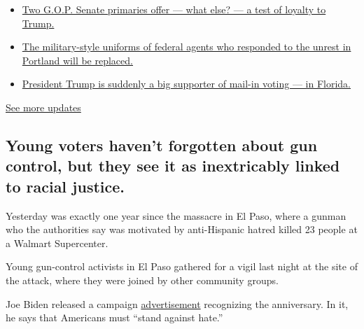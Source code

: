 \begin{itemize}
\tightlist
\item
  \href{https://www.nytimes.com/2020/08/04/us/elections/primary-election-michigan-arizona-kansas.html?action=click\&pgtype=Article\&state=default\&region=MAIN_CONTENT_1\&context=storylines_live_updates\#link-3924dd44}{Two
  G.O.P. Senate primaries offer --- what else? --- a test of loyalty to
  Trump.}
\item
  \href{https://www.nytimes.com/2020/08/04/us/elections/primary-election-michigan-arizona-kansas.html?action=click\&pgtype=Article\&state=default\&region=MAIN_CONTENT_1\&context=storylines_live_updates\#link-62a8e06b}{The
  military-style uniforms of federal agents who responded to the unrest
  in Portland will be replaced.}
\item
  \href{https://www.nytimes.com/2020/08/04/us/elections/primary-election-michigan-arizona-kansas.html?action=click\&pgtype=Article\&state=default\&region=MAIN_CONTENT_1\&context=storylines_live_updates\#link-32b39e33}{President
  Trump is suddenly a big supporter of mail-in voting --- in Florida.}
\end{itemize}

\href{https://www.nytimes.com/2020/08/04/us/elections/primary-election-michigan-arizona-kansas.html?action=click\&pgtype=Article\&state=default\&region=MAIN_CONTENT_1\&context=storylines_live_updates}{See
more updates}

\hypertarget{young-voters-havent-forgotten-about-gun-control-but-they-see-it-as-inextricably-linked-to-racial-justice}{%
\subsection{Young voters haven't forgotten about gun control, but they
see it as inextricably linked to racial
justice.}\label{young-voters-havent-forgotten-about-gun-control-but-they-see-it-as-inextricably-linked-to-racial-justice}}

Yesterday was exactly one year since the massacre in El Paso, where a
gunman who the authorities say was motivated by anti-Hispanic hatred
killed 23 people at a Walmart Supercenter.

Young gun-control activists in El Paso gathered for a vigil last night
at the site of the attack, where they were joined by other community
groups.

Joe Biden released a campaign
\href{https://www.youtube.com/watch?v=BbQQEPwarmU}{advertisement}
recognizing the anniversary. In it, he says that Americans must ``stand
against hate.''

